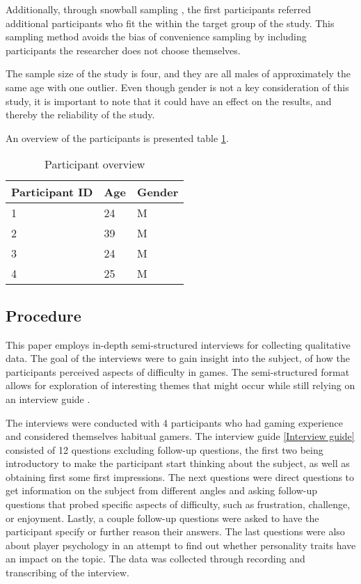 Additionally, through snowball sampling \cite{thomas_bjorner_qualitative_2015}, the first participants referred additional participants who fit the within the target group of the study. This sampling method avoids the bias of convenience sampling by including participants the researcher does not choose themselves. 

The sample size of the study is four, and they are all males of approximately the same age with one outlier. Even though gender is not a key consideration of this study, it is important to note that it could have an effect on the results, and thereby the reliability of the study. 

An overview of the participants is presented table \ref{Participant overview}.

\begin{table}[ht]
\centering
\begin{tabular}{|l|l|l|} \hline %
\textbf{Participant ID}& \textbf{Age} &\textbf{Gender}\\
\hline
1& 24 &M\\ \hline
2& 39 &M\\ \hline
 3&24 &M\\ \hline
 4&25 &M\\\hline
\end{tabular}
\caption{Participant overview}\label{Participant overview}
\end{table}


\subsection{Procedure}
This paper employs in-depth semi-structured interviews for collecting qualitative data. The goal of the interviews were to gain insight into the subject, of how the participants perceived aspects of difficulty in games. The semi-structured format allows for exploration of interesting themes that might occur while still relying on an interview guide \cite{thomas_bjorner_qualitative_2015}. 

The interviews were conducted with 4 participants who had gaming experience and considered themselves habitual gamers. The interview guide \ref{Interview guide} consisted of 12 questions excluding follow-up questions, the first two being introductory to make the participant start thinking about the subject, as well as obtaining first some first impressions. The next questions were direct questions to get information on the subject from different angles and asking follow-up questions that probed specific aspects of difficulty, such as frustration, challenge, or enjoyment. 
Lastly, a couple follow-up questions were asked to have the participant specify or further reason their answers. The last questions were also about player psychology in an attempt to find out whether personality traits have an impact on the topic. The data was collected through recording and transcribing of the interview.

